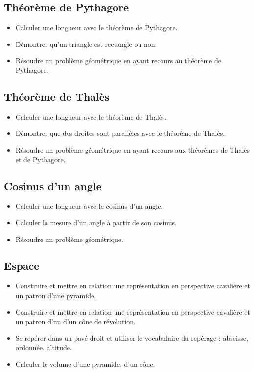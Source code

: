 \documentclass[a4paper,12pt,fleqn]{article}
\begin{document}
\subsection*{Théorème de Pythagore}

\begin{itemize}[itemsep=1em]
	\item {}Calculer une longueur avec le théorème de Pythagore.
	\item {}Démontrer qu'un triangle est rectangle ou non.
	\item {}Résoudre un problème géométrique en ayant recours au théorème de Pythagore.
\end{itemize}

\subsection*{Théorème de Thalès}

\begin{itemize}[itemsep=1em]
	\item {}Calculer une longueur avec le théorème de Thalès.
	\item {}Démontrer que des droites sont parallèles avec le théorème de Thalès.
	\item {}Résoudre un problème géométrique en ayant recours aux théorèmes de Thalès et de Pythagore.
\end{itemize}

\subsection*{Cosinus d'un angle}

\begin{itemize}[itemsep=1em]
	\item {}Calculer une longueur avec le cosinus d'un angle.
	\item {}Calculer la mesure d'un angle à partir de son cosinus.
	\item {}Résoudre un problème géométrique.
\end{itemize}

\subsection*{Espace}

\begin{itemize}[itemsep=1em]
	\item {}Construire et mettre en relation une représentation en perspective cavalière et un patron d’une pyramide.
	\item {}Construire et mettre en relation une représentation en perspective cavalière et un patron d’un d’un cône de révolution.
	\item {}Se repérer dans un pavé droit et utiliser le vocabulaire du repérage : abscisse, ordonnée, altitude.
	\item {}Calculer le volume d’une pyramide, d’un cône.
\end{itemize}
\end{document}
